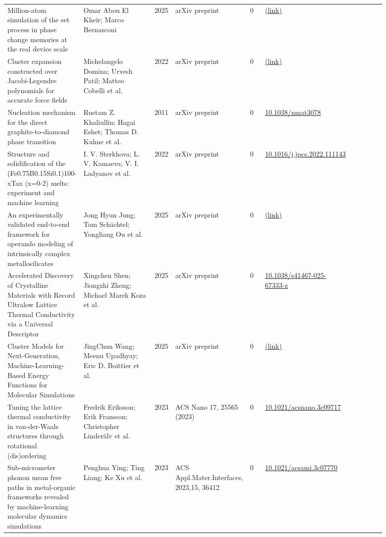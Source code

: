 \documentclass[10pt,a4paper]{article}
\begin{document}
{\begin{longtable}{p{0.192\linewidth}p{0.192\linewidth}p{0.043\linewidth}p{0.192\linewidth}p{0.043\linewidth}p{0.132\linewidth}p{0.096\linewidth}}
Million-atom simulation of the set process in phase change memories at the real device scale & Omar Abou El Kheir; Marco Bernasconi & 2025 & arXiv preprint & 0 & \href{http://arxiv.org/abs/2501.07384v1}{(link)} &  \\
Cluster expansion constructed over Jacobi-Legendre polynomials for accurate force fields & Michelangelo Domina; Urvesh Patil; Matteo Cobelli et al. & 2022 & arXiv preprint & 0 & \href{http://arxiv.org/abs/2208.10292v3}{(link)} &  \\
Nucleation mechanism for the direct graphite-to-diamond phase transition & Rustam Z. Khaliullin; Hagai Eshet; Thomas D. Kuhne et al. & 2011 & arXiv preprint & 0 & \href{https://doi.org/10.1038/nmat3078}{10.1038/nmat3078} &  \\
Structure and solidification of the (Fe0.75B0.15Si0.1)100-xTax (x=0-2) melts: experiment and machine learning & I. V. Sterkhova; L. V. Kamaeva; V. I. Ladyanov et al. & 2022 & arXiv preprint & 0 & \href{https://doi.org/10.1016/j.jpcs.2022.111143}{10.1016/j.jpcs.2022.111143} &  \\
An experimentally validated end-to-end framework for operando modeling of intrinsically complex metallosilicates & Jong Hyun Jung; Tom Schächtel; Yongliang Ou et al. & 2025 & arXiv preprint & 0 & \href{http://arxiv.org/abs/2512.02309v2}{(link)} &  \\
Accelerated Discovery of Crystalline Materials with Record Ultralow Lattice Thermal Conductivity via a Universal Descriptor & Xingchen Shen; Jiongzhi Zheng; Michael Marek Koza et al. & 2025 & arXiv preprint & 0 & \href{https://doi.org/10.1038/s41467-025-67333-z}{10.1038/s41467-025-67333-z} &  \\
Cluster Models for Next-Generation, Machine-Learning-Based Energy Functions for Molecular Simulations & JingChun Wang; Meenu Upadhyay; Eric D. Boittier et al. & 2025 & arXiv preprint & 0 & \href{http://arxiv.org/abs/2509.11639v1}{(link)} &  \\
Tuning the lattice thermal conductivity in van-der-Waals structures through rotational (dis)ordering & Fredrik Eriksson; Erik Fransson; Christopher Linderälv et al. & 2023 & ACS Nano 17, 25565 (2023) & 0 & \href{https://doi.org/10.1021/acsnano.3c09717}{10.1021/acsnano.3c09717} &  \\
Sub-micrometer phonon mean free paths in metal-organic frameworks revealed by machine-learning molecular dynamics simulations & Penghua Ying; Ting Liang; Ke Xu et al. & 2023 & ACS Appl.Mater.Interfaces, 2023,15, 36412 & 0 & \href{https://doi.org/10.1021/acsami.3c07770}{10.1021/acsami.3c07770} &  \\

\end{longtable}}
\end{document}
